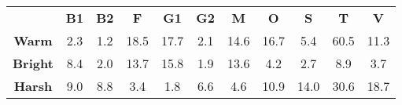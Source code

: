 \begin{tabular}{|c||c|c|c|c|c|c|c|c|c|c|}
	\cline{2-11}
	\multicolumn{1}{c|}{} & \bf{B1} & \bf{B2} & \bf{F} & \bf{G1} & \bf{G2} & \bf{M} & \bf{O} & \bf{S} & \bf{T} & \bf{V} \tabularnewline
	\hhline{-::=:=:=:=:=:=:=:=:=:=:}
	\bf{Warm} &  2.3 &  1.2 & 18.5 & 17.7 &  2.1 & 14.6 & 16.7 &  5.4 & 60.5 & 11.3 \tabularnewline
	\hline
	\bf{Bright} &  8.4 &  2.0 & 13.7 & 15.8 &  1.9 & 13.6 &  4.2 &  2.7 &  8.9 &  3.7 \tabularnewline
	\hline
	\bf{Harsh} &  9.0 &  8.8 &  3.4 &  1.8 &  6.6 &  4.6 & 10.9 & 14.0 & 30.6 & 18.7 \tabularnewline
	\hline
\end{tabular}
